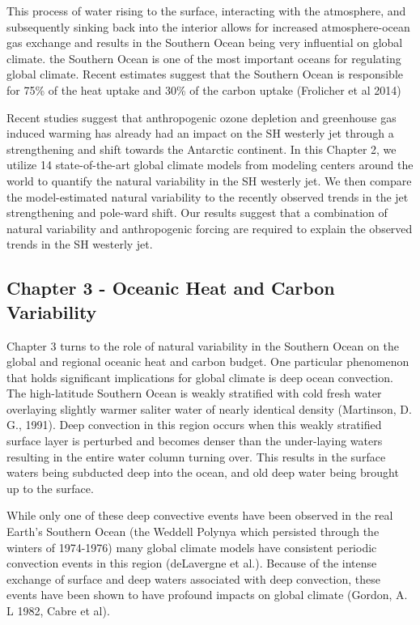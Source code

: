 This process of water rising to the surface, interacting with the atmosphere, and subsequently sinking back into the interior allows for increased atmosphere-ocean gas exchange and results in the Southern Ocean being very influential on global climate. the Southern Ocean is one of the most important oceans for regulating global climate. Recent estimates suggest that the Southern Ocean is responsible for 75\% of the heat uptake and 30\% of the carbon uptake (Frolicher et al 2014)

Recent studies suggest that anthropogenic ozone depletion and greenhouse gas induced warming has already had an impact on the SH westerly jet through a strengthening and shift towards the Antarctic continent. In this Chapter 2, we utilize 14 state-of-the-art global climate models from modeling centers around the world to quantify the natural variability in the SH westerly jet. We then compare the model-estimated natural variability to the recently observed trends in the jet strengthening and pole-ward shift. Our results suggest that a combination of natural variability and anthropogenic forcing are required to explain the observed trends in the SH westerly jet.

\subsection{Chapter 3 - Oceanic Heat and Carbon Variability}
Chapter 3 turns to the role of natural variability in the Southern Ocean on the global and regional oceanic heat and carbon budget. One particular phenomenon that holds significant implications for global climate is deep ocean convection. The high-latitude Southern Ocean is weakly stratified with cold fresh water overlaying slightly warmer saliter water of nearly identical density (Martinson, D. G., 1991). Deep convection in this region occurs when this weakly stratified surface layer is perturbed and becomes denser than the under-laying waters resulting in the entire water column turning over. This results in the surface waters being subducted deep into the ocean, and old deep water being brought up to the surface.

While only one of these deep convective events have been observed in the real Earth's Southern Ocean (the Weddell Polynya which persisted through the winters of 1974-1976) many global climate models have consistent periodic convection events in this region (deLavergne et al.). Because of the intense exchange of surface and deep waters associated with deep convection, these events have been shown to have profound impacts on global climate (Gordon, A. L 1982, Cabre et al).

